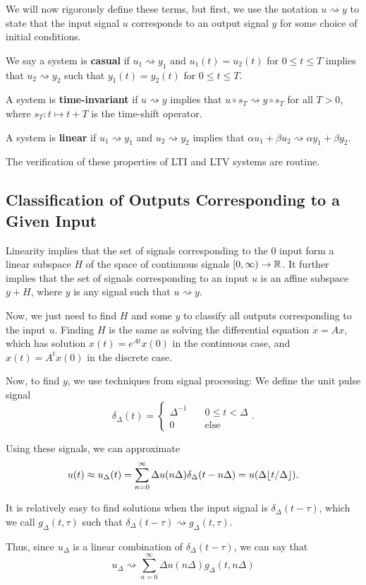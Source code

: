 We will now rigorously define these terms, but first, we use the notation $u \rightsquigarrow y$ to state that the input signal $u$ corresponds to an output signal $y$ for some choice of initial conditions.

\begin{definition}
    We say a system is \textbf{casual} if $u_1 \rightsquigarrow y_1$ and $u_1(t) = u_2(t)$ for $0 \le t \le T$ implies that $u_2 \rightsquigarrow y_2$ such that $y_1(t) = y_2(t)$ for $0 \le t \le T$.

    A system is \textbf{time-invariant} if $u \rightsquigarrow y$ implies that $u \circ s_T \rightsquigarrow y \circ s_T$ for all $T > 0$, where $s_T \colon t \mapsto t + T$ is the time-shift operator.

    A system is \textbf{linear} if $u_1 \rightsquigarrow y_1$ and $u_2 \rightsquigarrow y_2$ implies that $\alpha u_1 + \beta u_2 \rightsquigarrow \alpha y_1 + \beta y_2$.
\end{definition}

The verification of these properties of LTI and LTV systems are routine.

\subsection{Classification of Outputs Corresponding to a Given Input}

Linearity implies that the set of signals corresponding to the $0$ input form a linear subspace $H$ of the space of continuous signals $[0, \infty) \to \mathbb R$. It further implies that the set of signals corresponding to an input $u$ is an affine subspace $y + H$, where $y$ is any signal such that $u \rightsquigarrow y$.

Now, we just need to find $H$ and some $y$ to classify all outputs corresponding to the input $u$. Finding $H$ is the same as solving the differential equation $\dot x = Ax$, which has solution $x(t) = e^{At}x(0)$ in the continuous case, and $x(t) = A^t x(0)$ in the discrete case.

Now, to find $y$, we use techniques from signal processing: We define the unit pulse signal \[\delta_\Delta(t) = \begin{cases}
    \Delta^{-1} \quad & 0 \le t < \Delta \\
    0 & \text{else}
\end{cases}.\]

Using these signals, we can approximate \[u(t) \approx u_\Delta(t) = \sum_{n = 0}^\infty \Delta u(n\Delta)\delta_\Delta(t - n\Delta) = u\qty(\Delta \lfloor t/\Delta \rfloor).\]

It is relatively easy to find solutions when the input signal is $\delta_\Delta(t - \tau)$, which we call $g_\Delta(t, \tau)$ such that $\delta_\Delta(t - \tau) \rightsquigarrow g_\Delta(t, \tau)$.

Thus, since $u_\Delta$ is a linear combination of $\delta_\Delta(t - \tau)$, we can say that \[u_\Delta \rightsquigarrow \sum_{n = 0}^\infty \Delta u(n\Delta)g_\Delta(t, n\Delta)\]